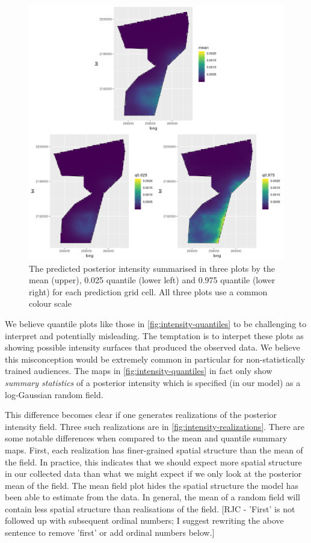 \documentclass[preprint,12pt]{elsarticle}
\begin{document}
\begin{figure}
	\includegraphics[scale=0.5]{figures/intensity_quantiles.png}
	\caption{The predicted posterior intensity summarised in three plots by the mean (upper),  0.025 quantile (lower left) and 0.975 quantile (lower right) for each prediction grid cell.  All three plots use a common colour scale}
	\label{fig:intensity-quantiles}
\end{figure}

We believe quantile plots like those in \autoref{fig:intensity-quantiles} to be challenging to interpret and potentially misleading.  The temptation is to interpet these plots as showing possible intensity surfaces that produced the observed data.  We believe this misconception would be extremely common in particular for non-statistically trained audiences. The maps in \autoref{fig:intensity-quantiles} in fact only show \textit{summary statistics} of a posterior intensity which is specified (in our model) as a log-Gaussian random field.

This difference becomes clear if one generates realizations of the posterior intensity field.  Three such realizations are in \autoref{fig:intensity-realizations}.  There are some notable differences when compared to the mean and quantile summary maps.  First, each realization has finer-grained spatial structure than the mean of the field.  In practice, this indicates that we should expect more spatial structure in our collected data than what we might expect if we only look at the posterior mean of the field.  The mean field plot hides the spatial structure the model has been able to estimate from the data.  In general, the mean of a random field will contain less spatial structure than realisations of the field. [RJC - 'First' is not followed up with subsequent ordinal numbers; I suggest rewriting the above sentence to remove 'first' or add ordinal numbers below.]
\end{document}
